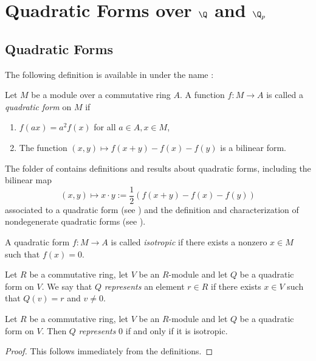 \chapter[Quadratic Forms over the Rationals and the p-adics]{Quadratic Forms over $\Q$ and $\Q_p$}

\section{Quadratic Forms}\label{sec:quadratic_form}

The following definition is available in \mathlib under the name :
\begin{definition}\label{def:quadratic_form}
\mathlibok
Let $M$ be a module over a commutative ring $A$. A function $f : M \to A$ is called a \emph{quadratic form} on $M$ if 
\begin{enumerate}
\item $f(ax) = a^2f(x)$ for all $a \in A, x \in M$,
\item The function $(x, y) \mapsto f(x + y) - f(x) - f(y)$ is a bilinear form.
\end{enumerate}
\end{definition}

The  folder of \mathlib contains definitions and results about quadratic forms, including the bilinear map 
\[ (x, y) \mapsto x \cdot y := \frac{1}{2}(f(x + y) - f(x) - f(y))\] associated to a quadratic form (see ) and the definition and characterization of nondegenerate quadratic forms (see ).

\begin{definition}\label{def:isotropic}
\leanok
A quadratic form $f : M \to A$ is called \emph{isotropic} if there exists a nonzero $x \in M$ such that $f(x) = 0$.
\end{definition}

\begin{definition}\label{def:represents}
	\leanok
	Let $R$ be a commutative ring, let $V$ be an $R$-module and let $Q$ be a quadratic form on $V$. We say that $Q$ \emph{represents} an element $r \in R$ if there exists $x \in V$ such that $Q(v) = r$ and $v \ne 0$.
\end{definition}

\begin{lemma}\label{lem:represents_zero}
	\leanok
	Let $R$ be a commutative ring, let $V$ be an $R$-module and let $Q$ be a quadratic form on $V$. Then $Q$ \emph{represents} $0$ if and only if it is isotropic.
\end{lemma}
\begin{proof}
	This follows immediately from the definitions.
\end{proof}


